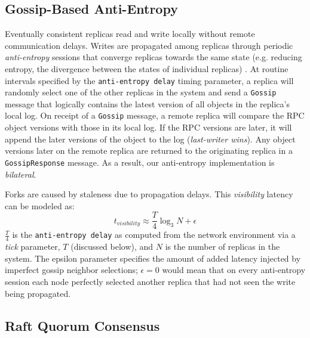 \documentclass[10pt,conference,letterpaper]{IEEEtran}
\begin{document}

\subsection{Gossip-Based Anti-Entropy}

Eventually consistent replicas  read and write locally without remote communication delays.
Writes are propagated among replicas through
periodic \textit{anti-entropy} sessions that
converge replicas towards the same state (e.g.
reducing entropy, the divergence between the states of individual replicas)
\cite{kempe_gossip-based_2003}.
At routine intervals specified by the \texttt{anti-entropy delay} timing parameter, a
replica will randomly select one of the other replicas in the system and send a
\texttt{Gossip} message that logically contains the latest version of all objects in the replica's
local log.
On receipt of a \texttt{Gossip} message, a remote replica will compare the RPC object
versions with those in its local log.
If the RPC versions are later, it will append the later versions of the object to the log
(\textit{last-writer wins}).
Any object versions later on the remote replica are returned to the
originating replica in a \texttt{GossipResponse} message.
As a result, our anti-entropy implementation is \textit{bilateral}.

Forks are caused by staleness due to propagation delays.
This \emph{visibility} latency can be modeled as:
\begin{equation}
t_{visibility} \approx \frac{T}{4} \log_3N + \epsilon
\end{equation}
$\frac{T}{4}$ is the
\texttt{anti-entropy delay} as computed from the network environment via a \emph{tick}
parameter, $T$ (discussed below), and $N$ is the number of replicas in the system.
The epsilon parameter specifies the amount of added latency injected by imperfect gossip
neighbor selections; $\epsilon = 0$ would mean that on every anti-entropy session
each node perfectly selected another replica that had not seen the write being propagated.

\subsection{Raft Quorum Consensus}
\end{document}
